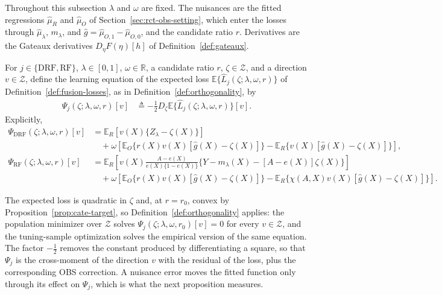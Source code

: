 Throughout this subsection $\lambda$ and $\omega$ are fixed. The nuisances are the fitted regressions $\widehat\mu_R$ and $\widehat\mu_O$ of Section~\ref{sec:rct-obs-setting}, which enter the losses through $\widehat\mu_\lambda$, $m_\lambda$, and $\widehat g=\widehat\mu_{O,1}-\widehat\mu_{O,0}$, and the candidate ratio $r$.  Derivatives are the Gateaux derivatives $D_\eta F(\eta)[h]$ of Definition~\ref{def:gateaux}.

\begin{definition}
\label{def:learning-equations}
For $j\in\{\mathrm{DRF},\mathrm{RF}\}$, $\lambda\in[0,1]$, $\omega\in\mathbb R$, a candidate ratio $r$, $\zeta\in\mathcal Z$, and a direction $v\in\mathcal Z$, define the learning equation of the expected loss $\mathbb E\{\widehat L_j(\zeta;\lambda,\omega,r)\}$ of Definition~\ref{def:fusion-losses}, as in Definition~\ref{def:orthogonality}, by
\begin{align}
\Psi_j(\zeta;\lambda,\omega,r)[v]&\triangleq-\frac12D_\zeta\mathbb E\{\widehat L_j(\zeta;\lambda,\omega,r)\}[v].
\label{eq:learning-equation}
\end{align}
Explicitly,
\begin{align}
\Psi_{\mathrm{DRF}}(\zeta;\lambda,\omega,r)[v]
&=\mathbb E_R[v(X)\{Z_\lambda-\zeta(X)\}]
\nonumber\\
&\quad+\omega\left[\mathbb E_O\{r(X)v(X)[\widehat g(X)-\zeta(X)]\}-\mathbb E_R\{v(X)[\widehat g(X)-\zeta(X)]\}\right],
\label{eq:drf-learning-equation}\\
\Psi_{\mathrm{RF}}(\zeta;\lambda,\omega,r)[v]
&=\mathbb E_R\left[v(X)\frac{A-e(X)}{e(X)\{1-e(X)\}}\{Y-m_\lambda(X)-[A-e(X)]\zeta(X)\}\right]
\nonumber\\
&\quad+\omega\left[\mathbb E_O\{r(X)v(X)[\widehat g(X)-\zeta(X)]\}-\mathbb E_R\{\chi(A,X)v(X)[\widehat g(X)-\zeta(X)]\}\right].
\label{eq:rf-learning-equation}
\end{align}
\end{definition}

 The expected loss is quadratic in $\zeta$ and, at $r=r_0$, convex by Proposition~\ref{prop:cate-target}, so Definition~\ref{def:orthogonality} applies: the population minimizer over $\mathcal Z$ solves $\Psi_j(\zeta;\lambda,\omega,r_0)[v]=0$ for every $v\in\mathcal Z$, and the tuning-sample optimization solves the empirical version of the same equation. The factor $-\tfrac12$ removes the constant produced by differentiating a square, so that $\Psi_j$ is the cross-moment of the direction $v$ with the residual of the loss, plus the corresponding OBS correction. A nuisance error moves the fitted function only through its effect on $\Psi_j$, which is what the next proposition measures.


